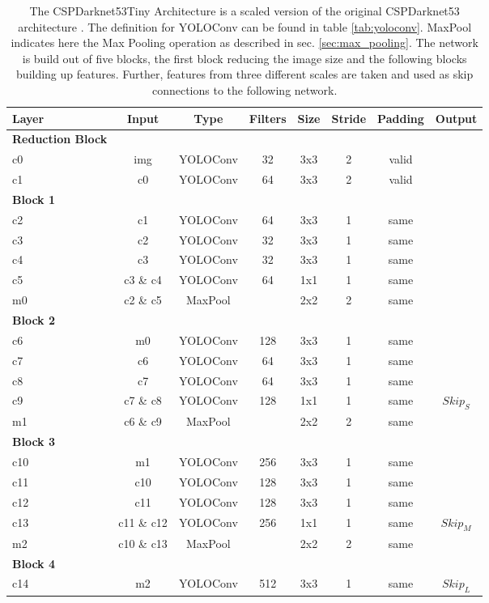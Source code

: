 \begin{table} %
\begin{center}

\begin{tabular}{l|c|c|c|c|c|c|c}
    \textbf{Layer} & \textbf{Input} & \textbf{Type} & \textbf{Filters} & \textbf{Size} & \textbf{Stride} & \textbf{Padding} & \textbf{Output} \\
    \hline
    \textbf{Reduction Block} & & & & & &\\
    c0 & img & YOLOConv & 32 & 3x3 & 2 & valid\\
    c1 & c0 & YOLOConv & 64 & 3x3 & 2 & valid\\
    \textbf{Block 1} & & & & & &\\
    c2 & c1 & YOLOConv & 64 & 3x3 & 1 & same\\
    c3 & c2 & YOLOConv & 32 & 3x3 & 1 & same\\
    c4 & c3 & YOLOConv & 32 & 3x3 & 1 & same\\
    c5 & c3 \& c4 & YOLOConv & 64 & 1x1 & 1 & same\\
    m0 & c2 \& c5 & MaxPool &  & 2x2 & 2 & same\\
    \textbf{Block 2} & & & & & &\\
    c6 & m0 & YOLOConv & 128 & 3x3 & 1 & same\\
    c7 & c6 & YOLOConv & 64 & 3x3 & 1 & same\\
    c8 & c7 & YOLOConv & 64 & 3x3 & 1 & same\\
    c9 & c7 \& c8 & YOLOConv & 128 & 1x1 & 1 & same & $Skip_S$\\
    m1 & c6 \& c9 & MaxPool & & 2x2  & 2 & same\\
    \textbf{Block 3} & & & & & &\\
    c10 & m1 & YOLOConv & 256 & 3x3 & 1 & same\\
    c11 & c10 & YOLOConv & 128 & 3x3 & 1 & same\\
    c12 & c11 & YOLOConv & 128 & 3x3 & 1 & same\\
    c13 & c11 \& c12 & YOLOConv &  256 & 1x1 & 1 & same & $Skip_M$\\
    m2 & c10 \& c13 & MaxPool & & 2x2 & 2 & same\\
    \textbf{Block 4} & & & & & &\\
    c14 & m2 & YOLOConv & 512 & 3x3 & 1 & same & $Skip_L$\\
\end{tabular}

\caption{The CSPDarknet53Tiny Architecture is a scaled version of the original CSPDarknet53 architecture \cite{yolov4}. The definition for YOLOConv can be found in table \ref{tab:yoloconv}. MaxPool indicates here the Max Pooling operation as described in sec. \ref{sec:max_pooling}. The network is build out of five blocks, the first block reducing the image size and the following blocks building up features. Further, features from three different scales are taken and used as skip connections to the following network.}
\label{tab:darknet_tiny_arch}
\end{center}
\end{table}

